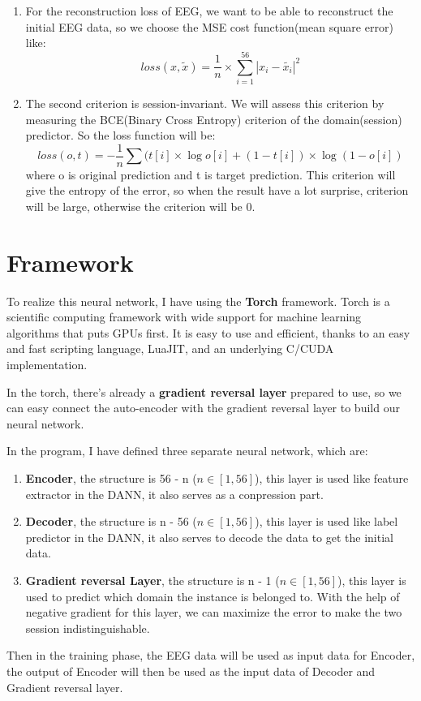 \begin{enumerate}
	\item For the reconstruction loss of EEG, we want to be able to reconstruct the initial EEG data, so we choose the MSE cost function(mean square error) like:
	\[ loss(x, \tilde{x}) = \frac{1}{n} \times \sum_{i=1}^{56}| x_{i}-\tilde{x_{i}}|^2 \]

	\item The second criterion is session-invariant. We will assess this criterion by measuring the BCE(Binary Cross Entropy) criterion of the domain(session) predictor. So the loss function will be:
	\[ loss(o, t) = -\frac{1}{n} \sum(t[i]\times \log o[i]  +  (1-t[i])\times\log (1-o[i]) \]
	where o is original prediction and t is target prediction. This criterion will give the entropy of the error, so when the result have a lot surprise, criterion will be large, otherwise the criterion will be 0.
\end{enumerate}

\section{Framework}
To realize this neural network, I have using the \textbf{Torch} framework. Torch is a scientific computing framework with wide support for machine learning algorithms that puts GPUs first. It is easy to use and efficient, thanks to an easy and fast scripting language, LuaJIT, and an underlying C/CUDA implementation.

In the torch, there's already a \textbf{gradient reversal layer} prepared to use, so we can easy connect the auto-encoder with the gradient reversal layer to build our neural network.

In the program, I have defined three separate neural network, which are:
\begin{enumerate}
	\item \textbf{Encoder}, the structure is 56 - n ($ n \in [1,56] $), this layer is used like feature extractor in the DANN, it also serves as a conpression part.
	\item \textbf{Decoder}, the structure is n - 56 ($ n \in [1,56] $), this layer is used like label predictor in the DANN, it also serves to decode the data to get the initial data.
	\item \textbf{Gradient reversal Layer}, the structure is n - 1 ($ n \in [1,56] $), this layer is used to predict which domain the instance is belonged to. With the help of negative gradient for this layer, we can maximize the error to make the two session indistinguishable. 
\end{enumerate}

Then in the training phase, the EEG data will be used as input data for Encoder, the output of Encoder will then be used as the input data of Decoder and Gradient reversal layer.

